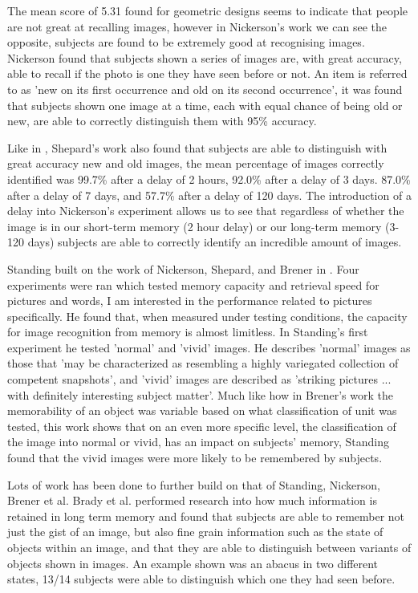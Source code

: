 \documentclass{UoYCSproject}
\begin{document}
The mean score of 5.31 found for geometric designs seems to indicate that people are not great at recalling images, however in Nickerson's work \cite{NickersonShortTermMemory} we can see the opposite, subjects are found to be extremely good at recognising images. Nickerson found that subjects shown a series of images are, with great accuracy, able to recall if the photo is one they have seen before or not. An item is referred to as 'new on its first occurrence and old on its second occurrence'\cite[p.156]{NickersonShortTermMemory}, it was found that subjects shown one image at a time, each with equal chance of being old or new, are able to correctly distinguish them with 95\% accuracy. 

Like in \cite{NickersonShortTermMemory}, Shepard's work \cite{ShepardRecognition} also found that subjects are able to distinguish with great accuracy new and old images, the mean percentage of images correctly identified was 99.7\% after a delay of 2 hours, 92.0\% after a delay of 3 days. 87.0\% after a delay of 7 days, and 57.7\% after a delay of 120 days. The introduction of a delay into Nickerson's experiment allows us to see that regardless of whether the image is in our short-term memory (2 hour delay) or our long-term memory (3-120 days) subjects are able to correctly identify an incredible amount of images. 

Standing built on the work of Nickerson, Shepard, and Brener in \cite{standing10000pictures}. Four experiments were ran which tested memory capacity and retrieval speed for pictures and words, I am interested in the performance related to pictures specifically. He found that, when measured under testing conditions, the capacity for image recognition from memory is almost limitless. In Standing's first experiment he tested 'normal' and 'vivid' images. He describes 'normal' images as those that 'may be characterized as resembling a highly variegated collection of competent snapshots'\cite[p.208]{standing10000pictures}, and 'vivid' images are described as 'striking pictures ... with definitely interesting subject matter'\cite[p.208]{standing10000pictures}. Much like how in Brener's work \cite{BrenerMemorySpan} the memorability of an object was variable based on what classification of unit was tested, this work shows that on an even more specific level, the classification of the image into normal or vivid, has an impact on subjects' memory, Standing found that the vivid images were more likely to be remembered by subjects.

Lots of work has been done to further build on that of Standing, Nickerson, Brener et al. Brady et al. \cite{brady2008visual} performed research into how much information is retained in long term memory and found that subjects are able to remember not just the gist of an image, but also fine grain information such as the state of objects within an image, and that they are able to distinguish between variants of objects shown in images. An example shown was an abacus in two different states, 13/14 subjects were able to distinguish which one they had seen before.
\end{document}
